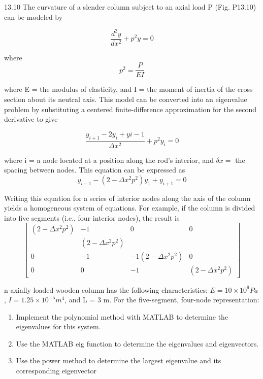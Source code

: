 \documentclass[../main.tex]{subfiles}
\begin{document}
13.10 The curvature of a slender column subject to an axial
load P (Fig. P13.10) can be modeled by

\begin{equation}
\frac{d^{2}y}{dx^{2}}+p^{2}y=0
\end{equation}

where
\begin{equation}
p^{2}=\frac{P}{EI}
\end{equation}

where E = the modulus of elasticity, and I = the moment of
inertia of the cross section about its neutral axis.
This model can be converted into an eigenvalue problem
by substituting a centered finite-difference approximation
for the second derivative to give

\begin{equation}
\frac{y_{i+1}-2y_{i}+y{i-1}}{\Delta x^{2}}+p^{2}y_{i}=0
\end{equation}

where i = a node located at a position along the rod's interior, and $\delta x=$ the spacing between nodes. This equation can
be expressed as
\begin{equation}
y_{i-1}-(2-\Delta x^{2}p^{2})y_{1}+y_{i+1}=0
\end{equation}

Writing this equation for a series of interior nodes along the
axis of the column yields a homogeneous system of equations. For example, if the column is divided into five segments (i.e., four interior nodes), the result is
\begin{equation}
\begin{bmatrix}
(2-\Delta x^{2}p^{2}) & -1 & 0 &0 \\
 & (2-\Delta x^{2}p^{2}) &  & \\
 0& -1 &-1 (2-\Delta x^{2}p^{2}) & 0\\
 0& 0 & -1 & (2-\Delta x^{2}p^{2})
\end{bmatrix}
\end{equation}

n axially loaded wooden column has the following characteristics: $E = 10 × 10^{9} Pa$, $I = 1.25 × 10^{-5} m^{4}$, and L = 3 m.
For the five-segment, four-node representation:

\begin{enumerate}[label=\alph*]
\item Implement the polynomial method with MATLAB to
determine the eigenvalues for this system.
\item Use the MATLAB eig function to determine the eigenvalues and eigenvectors.
\item Use the power method to determine the largest eigenvalue and its corresponding eigenvector
\end{enumerate}
\end{document}
